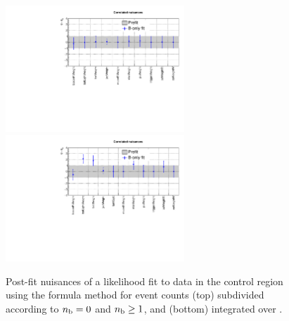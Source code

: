 \begin{figure}[h!]
  \centering
  \includegraphics[width=0.6\textwidth]{figures/btag/nuisances/formula/Correlated_nuisances_ge1b}
  \includegraphics[width=0.6\textwidth]{figures/btag/nuisances/formula/Correlated_nuisances_ge0b}
  \caption{\label{fig:btagsfge1b} Post-fit nuisances of a likelihood
    fit to data in the \mmj control region using the formula method
    for \mmj event counts (top) subdivided according to $n_{\text{b}} = 0$ and
    $n_{\text{b}} \geq 1$, and (bottom) integrated over \nb. }
\end{figure}

